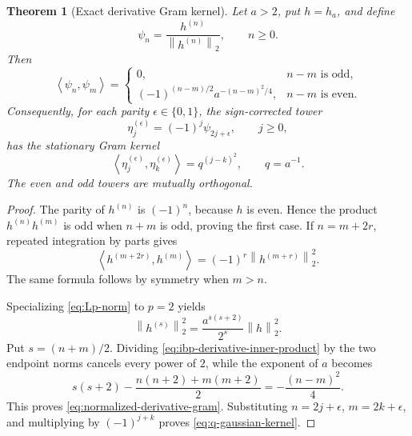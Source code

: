 \documentclass[11pt,oneside]{article}
\newtheorem{theorem}{Theorem}[section]
\theoremstyle{definition}
\theoremstyle{remark}
\newcommand{\norm}[1]{\left\lVert#1\right\rVert}
\newcommand{\ip}[2]{\left\langle#1,#2\right\rangle}
\begin{document}
\begin{theorem}[Exact derivative Gram kernel]
\label{thm:derivative-gram}
Let \(a>2\), put \(h=h_a\), and define
\[
  \psi_n=\frac{h^{(n)}}{\norm{h^{(n)}}_2},\qquad n\ge0.
\]
Then
\begin{equation}
 \ip{\psi_n}{\psi_m}=
 \begin{cases}
   0,&n-m\text{ is odd},\\[2mm]
   (-1)^{(n-m)/2}a^{-(n-m)^2/4},&n-m\text{ is even}.
 \end{cases}
 \label{eq:normalized-derivative-gram}
\end{equation}
Consequently, for each parity \(\epsilon\in\{0,1\}\), the sign-corrected tower
\begin{equation}
  \eta_j^{(\epsilon)}=(-1)^j\psi_{2j+\epsilon},\qquad j\ge0,
  \label{eq:eta-parity-tower}
\end{equation}
has the stationary Gram kernel
\begin{equation}
  \ip{\eta_j^{(\epsilon)}}{\eta_k^{(\epsilon)}}
    =q^{(j-k)^2},\qquad q=a^{-1}.
  \label{eq:q-gaussian-kernel}
\end{equation}
The even and odd towers are mutually orthogonal.
\end{theorem}

\begin{proof}
The parity of \(h^{(n)}\) is \((-1)^n\), because \(h\) is even.  Hence the product
\(h^{(n)}h^{(m)}\) is odd when \(n+m\) is odd, proving the first case.  If
\(n=m+2r\), repeated integration by parts gives
\begin{equation}
  \ip{h^{(m+2r)}}{h^{(m)}}=(-1)^r\norm{h^{(m+r)}}_2^2.
  \label{eq:ibp-derivative-inner-product}
\end{equation}
The same formula follows by symmetry when \(m>n\).

Specializing \eqref{eq:Lp-norm} to \(p=2\) yields
\begin{equation}
  \norm{h^{(s)}}_2^2
    =\frac{a^{s(s+2)}}{2^s}\norm h_2^2.
  \label{eq:L2-norm-squared}
\end{equation}
Put \(s=(n+m)/2\).  Dividing \eqref{eq:ibp-derivative-inner-product} by the two endpoint
norms cancels every power of \(2\), while the exponent of \(a\) becomes
\[
 s(s+2)-\frac{n(n+2)+m(m+2)}2=-\frac{(n-m)^2}{4}.
\]
This proves \eqref{eq:normalized-derivative-gram}.  Substituting \(n=2j+\epsilon\),
\(m=2k+\epsilon\), and multiplying by \((-1)^{j+k}\) proves
\eqref{eq:q-gaussian-kernel}.
\end{proof}
\end{document}
